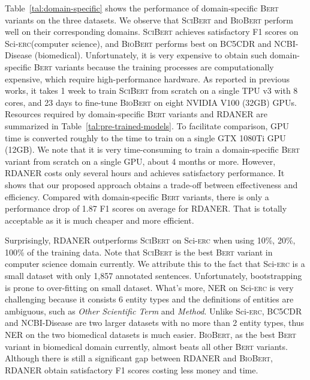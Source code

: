 \documentclass[10pt, conference, compsocconf]{IEEEtran}
\newcommand{\bert}{\textsc{Bert}\xspace}
\newcommand{\scibert}{\textsc{SciBert}\xspace}
\newcommand{\biobert}{\textsc{BioBert}\xspace}
\newcommand{\Scierc}{\textsc{S}ci-\textsc{erc}\xspace}
\newcommand{\rdaner}{\textsc{RDANER}\xspace}
\begin{document}
Table~\ref{tal:domain-specific} 
shows the performance of domain-specific \bert variants on the three datasets.
We observe that \scibert and \biobert perform well on their corresponding domains. \scibert achieves
satisfactory F1 scores on \Scierc (computer science), and 
\biobert performs best on BC5CDR and NCBI-Disease (biomedical). 
Unfortunately, it is very expensive to obtain such domain-specific \bert variants 
because the training processes are computationally expensive, which require high-performance hardware. 
As reported in previous works\cite{beltagy-etal-2019-scibert,lee2020biobert},
it takes 1 week to train \scibert from scratch on a single TPU v3 with 8 cores, 
and 23 days to fine-tune \biobert on eight NVIDIA V100 (32GB) GPUs.
Resources required by domain-specific \bert variants and \rdaner are summarized
in Table~\ref{tal:pre-trained-models}. 
To facilitate comparison, GPU time is converted roughly to the time to train on a single GTX 1080Ti GPU (12GB).
We note that it is very time-consuming to train a domain-specific \bert variant from scratch on a single GPU, 
about 4 months or more. However, \rdaner costs only several hours and achieves satisfactory performance.   
It shows that our proposed approach obtains a trade-off between effectiveness and efficiency.
Compared with domain-specific \bert variants, there is only
a performance drop of 1.87 F1 scores on average for \rdaner. 
That is totally acceptable as it is much cheaper and more efficient.

Surprisingly, \rdaner outperforms \scibert on \Scierc when using 10\%, 20\%, 100\% of the training data. 
Note that \scibert is the best \bert variant in computer science domain currently. 
We attribute this to the fact that \Scierc is a small dataset with only 1,857 annotated sentences.
Unfortunately, bootstrapping is prone to over-fitting on small dataset.
What's more, NER on \Scierc is very challenging because it consists 6 entity types 
and the definitions of entities are ambiguous, such as \textit{Other Scientific Term} and \textit{Method}. 
Unlike \Scierc, BC5CDR and NCBI-Disease are two larger datasets with no more than 2 entity types, thus
NER on the two biomedical datasets is much easier.
\biobert, as the best \bert variant in biomedical domain currently, almost beats all other \bert variants. 
Although there is still a significant gap between \rdaner and \biobert, \rdaner obtain satisfactory
F1 scores costing less money and time. 
\end{document}
